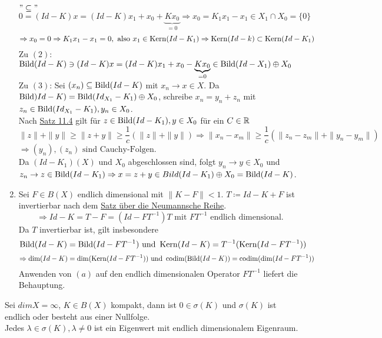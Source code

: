 \begin{beweis}
\begin{enumerate}[label=\alph*\upshape)]
				$"\subseteq"$ $0 = (Id - K) x = (Id - K) x_{1} + x_{0} + \underbrace{K x_{0}}_{= 0} \Rightarrow x_{0} = K_{1} x_{1} - x_{1} \in X_{1} \cap X_{0} = \{ 0 \} $
					\[ \Rightarrow x_{0} = 0 \Rightarrow K_{1} x_{1} - x_{1} = 0, \text{ also } x_{1} \in \mathop{\rm Kern}\nolimits(Id - K_{1}) \Rightarrow \mathop{\rm Kern}\nolimits(Id - k) \subset \mathop{\rm Kern}\nolimits(Id - K_{1}) \]
				Zu $(2)$: $\mathop{\rm Bild}\nolimits(Id - K) \ni (Id - K)x = (Id - K)x_{1} + x_{0} - \underbrace{K x_{0}}_{= 0} \in \mathop{\rm Bild}\nolimits(Id - X_{1}) \oplus X_{0}$ \\
				Zu $(3)$: Sei $(x_{n}) \subseteq \mathop{\rm Bild}\nolimits(Id - K)$ mit $x_{n} \rightarrow x \in X$. Da $\mathop{\rm Bild}\nolimits)Id - K) = \mathop{\rm Bild}\nolimits(Id_{X_{1}} - K_{1}) \oplus X_{0}$, schreibe $x_{n} = y_{n} + z_{n}$ mit $z_{n} \in \mathop{\rm Bild}\nolimits(Id_{X_{1}} - K_{1}), y_{n} \in X_{0}$. \\
				Nach \hyperref[satz:11.4]{Satz 11.4} gilt für $z \in \mathop{\rm Bild}\nolimits(Id - K_{1}), y \in X_{0}$ für ein $C \in \mathbb{R}$
				\[ \| z \| + \| y \| \geq \| z + y \| \geq \frac{1}{c} \left( \| z \| + \| y \| \right) \Rightarrow \| x_{n} - x_{m} \| \geq \frac{1}{c} \left( \| z_{n} - z_{m} \| + \| y_{n} - y_{m} \| \right) \]
				$\Rightarrow (y_{n}), (z_{n}) \text{ sind Cauchy-Folgen}$. \\
				Da $(Id - K_{1})(X)$ und $X_{0}$ abgeschlossen sind, folgt $y_{n} \rightarrow y \in X_{0}$ und $z_{n} \rightarrow z \in \mathop{\rm Bild}\nolimits(Id - K_{1}) \Rightarrow x = z + y \in Bild(Id - K_{1}) \oplus X_{0} = \mathop{\rm Bild}\nolimits(Id - K)$.
			\item Sei $F \in B(X)$ endlich dimensional mit $\| K - F \| < 1$. $T \coloneqq Id - K + F$ ist invertierbar nach dem \hyperref[prop:5.8-NeumannscheReihe]{Satz über die Neumannsche Reihe}.
				\[ \Rightarrow Id - K = T - F = (Id - F T^{-1})T \text{ mit } F T^{-1} \text{ endlich dimensional.} \]
				Da $T$ invertierbar ist, gilt insbesondere
				\[ \mathop{\rm Bild}\nolimits(Id - K) = \mathop{\rm Bild}\nolimits(Id - F T^{-1}) \text{ und } \mathop{\rm Kern}\nolimits(Id - K) = T^{-1}(\mathop{\rm Kern}\nolimits(Id - F T^{-1})) \]
				\[ \Rightarrow \dim(Id - K) = \dim(\mathop{\rm Kern}\nolimits(Id - F T^{-1})) \text{ und } \operatorname{codim}(\mathop{\rm Bild}\nolimits(Id -K)) = \operatorname{codim}(\dim(Id - F T^{-1})) \]
				Anwenden von \hyperref[satz:14.1]{$(a)$} auf den endlich dimensionalen Operator $F T^{-1}$ liefert die Behauptung.
		\end{enumerate}
\end{beweis}


\begin{satz}  \label{satz:14.3}
	Sei $dim X = \infty$, $K \in B(X)$ kompakt, dann ist $0 \in \sigma(K)$ und $\sigma(K)$ ist endlich oder besteht aus einer Nullfolge. \\
	Jedes $\lambda \in \sigma(K), \lambda \neq 0$ ist ein Eigenwert mit endlich dimensionalem Eigenraum.
\end{satz}

